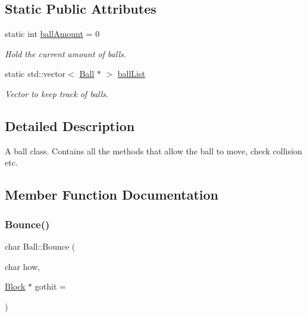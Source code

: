 \subsection*{Static Public Attributes}
\begin{DoxyCompactItemize}
\item 
\mbox{\label{class_ball_ad3c62a3deb711ae1baa9448224df9f74}} 
static int \hyperlink{class_ball_ad3c62a3deb711ae1baa9448224df9f74}{ball\+Amount} = 0
\begin{DoxyCompactList}\small\item\em Hold the current amount of balls. \end{DoxyCompactList}\item 
\mbox{\label{class_ball_a365ffb0673756a6b96fd7ae0d3c8b91b}} 
static std\+::vector$<$ \hyperlink{class_ball}{Ball} $\ast$ $>$ \hyperlink{class_ball_a365ffb0673756a6b96fd7ae0d3c8b91b}{ball\+List}
\begin{DoxyCompactList}\small\item\em Vector to keep track of balls. \end{DoxyCompactList}\end{DoxyCompactItemize}


\subsection{Detailed Description}
A ball class. Contains all the methods that allow the ball to move, check collision etc. 

\subsection{Member Function Documentation}
\mbox{\label{class_ball_a32baf305e64d31e71ba175aad54feb1b}} 
\subsubsection{\texorpdfstring{Bounce()}{Bounce()}}
{\footnotesize\ttfamily char Ball\+::\+Bounce (\begin{DoxyParamCaption}\item[{char}]{how,  }\item[{\hyperlink{class_block}{Block} $\ast$}]{gothit = {} }\end{DoxyParamCaption})}



